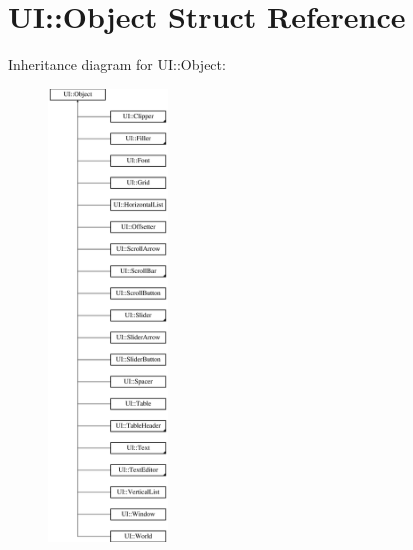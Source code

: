 \hypertarget{struct_u_i_1_1_object}{}\section{UI\+:\+:Object Struct Reference}
\label{struct_u_i_1_1_object}
Inheritance diagram for UI\+:\+:Object\+:\begin{figure}[H]
\begin{center}
\leavevmode
\includegraphics[height=12.000000cm]{struct_u_i_1_1_object}
\end{center}
\end{figure}
